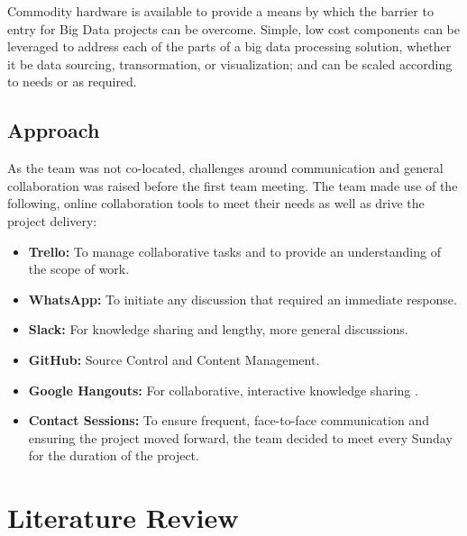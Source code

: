 \documentclass[12pt]{article} %
\begin{document}
Commodity hardware is available to provide a means by which the barrier to entry for Big Data projects can be overcome. Simple, low cost components can be leveraged to address each of the parts of a big data processing solution, whether it be data sourcing, transormation, or visualization; and can be scaled according to needs or as required.

\subsection{Approach}

As the team was not co-located, challenges around communication and general collaboration was raised before the first team meeting. 
The team made use of the following, online collaboration tools to meet their needs as well as drive the project delivery:
\begin{itemize}
	\item \textbf{Trello:} To manage collaborative tasks and to provide an understanding of the scope of work.
	\item \textbf{WhatsApp:} To initiate any discussion that required an immediate response.
	\item \textbf{Slack:} For knowledge sharing and lengthy, more general discussions.
	\item \textbf{GitHub:} Source Control and Content Management.
	\item \textbf{Google Hangouts:} For collaborative, interactive knowledge sharing .
	\item \textbf{Contact Sessions:} To ensure frequent, face-to-face communication and ensuring the project moved forward, the team decided to meet every Sunday for the duration of the project. 
\end{itemize}

	
		
		
	\section{Literature Review}
	
\end{document}
